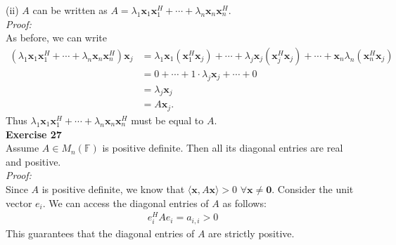 \documentclass[letterpaper,12pt]{article}
\let\vec\mathbf
\theoremstyle{definition}
\begin{document}
(ii) $A$ can be written as $A = \lambda_1 \vec{x}_1 \vec{x}_1^H + \cdots + \lambda_n \vec{x}_n \vec{x}_n^H$. \\
\textit{Proof:} \\
As before, we can write
\begin{align*}
  (\lambda_1 \vec{x}_1 \vec{x}_1^H + \cdots + \lambda_n \vec{x}_n \vec{x}_n^H)\vec{x}_j
  &= \lambda_1 \vec{x}_1 (\vec{x}_1^H \vec{x}_j) + \cdots + \lambda_j \vec{x}_j (\vec{x}_j^H \vec{x}_j) + \cdots + \vec{x}_n \lambda_n (\vec{x}_n^H \vec{x}_j) \\
  &= 0 + \cdots + 1 \cdot \lambda_j \vec{x}_j + \cdots + 0 \\
  &= \lambda_j \vec{x}_j \\
  &= A \vec{x}_j.
\end{align*}
Thus $\lambda_1 \vec{x}_1 \vec{x}_1^H + \cdots + \lambda_n \vec{x}_n \vec{x}_n^H$ must be equal to $A$. \\

\textbf{Exercise 27} \\
Assume $A \in M_n(\mathbb{F})$ is positive definite. Then all its diagonal entries are real and positive. \\
\textit{Proof:} \\
Since $A$ is positive definite, we know that $\langle \vec{x}, A\vec{x} \rangle > 0$ $\forall \vec{x} \neq \vec{0}$. Consider the unit vector $e_i$. We can access the diagonal entries of $A$ as follows:
\begin{align*}
  e_i^H A e_i = a_{i,i} > 0
\end{align*}
This guarantees that the diagonal entries of $A$ are strictly positive. \\
\end{document}
